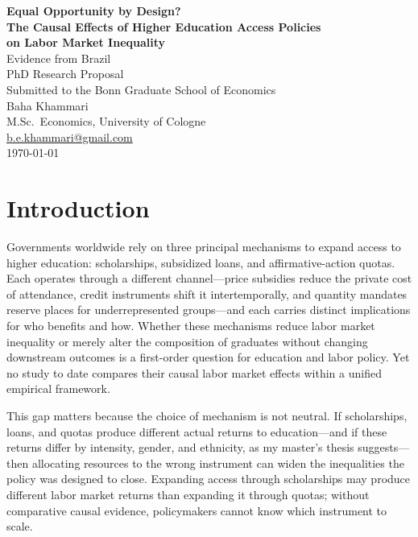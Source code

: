 \documentclass[a4paper,11pt]{article}
\begin{document}
\begin{center}
\vspace*{1cm}
{\LARGE \textbf{Equal Opportunity by Design?}} \\[8pt]
{\Large \textbf{The Causal Effects of Higher Education Access Policies}} \\[4pt]
{\Large \textbf{on Labor Market Inequality}} \\[8pt]
{\large Evidence from Brazil} \\[24pt]
{\large PhD Research Proposal} \\[4pt]
{\large Submitted to the Bonn Graduate School of Economics} \\[16pt]
{\large Baha Khammari} \\[4pt]
M.Sc.\ Economics, University of Cologne \\
\href{mailto:b.e.khammari@gmail.com}{b.e.khammari@gmail.com} \\[4pt]
\today
\end{center}

\vspace{24pt}

\section{Introduction}

Governments worldwide rely on three principal mechanisms to expand access to higher education: scholarships, subsidized loans, and affirmative-action quotas. Each operates through a different channel---price subsidies reduce the private cost of attendance, credit instruments shift it intertemporally, and quantity mandates reserve places for underrepresented groups---and each carries distinct implications for who benefits and how. Whether these mechanisms reduce labor market inequality or merely alter the composition of graduates without changing downstream outcomes is a first-order question for education and labor policy. Yet no study to date compares their causal labor market effects within a unified empirical framework.

This gap matters because the choice of mechanism is not neutral. If scholarships, loans, and quotas produce different actual returns to education---and if these returns differ by intensity, gender, and ethnicity, as my master's thesis suggests---then allocating resources to the wrong instrument can widen the inequalities the policy was designed to close. Expanding access through scholarships may produce different labor market returns than expanding it through quotas; without comparative causal evidence, policymakers cannot know which instrument to scale.
\end{document}
